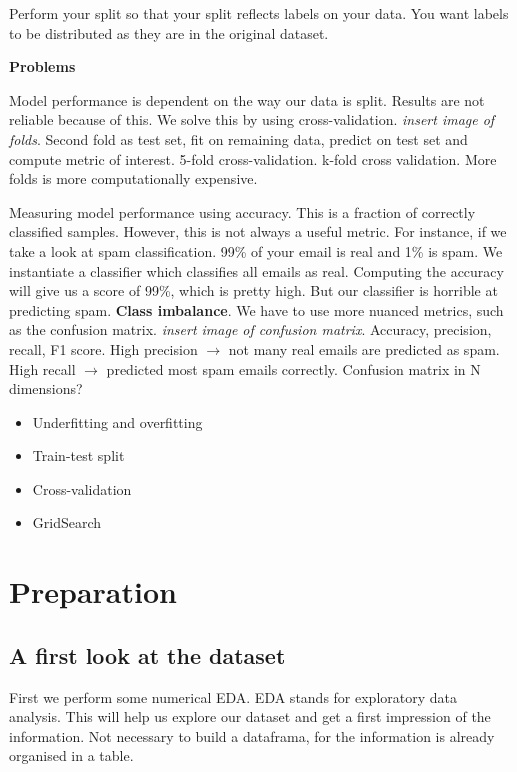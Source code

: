 \documentclass[11pt]{article}
\begin{document}
Perform your split so that your split reflects labels on your data. You want labels to be distributed as they are in the original dataset. 

\textbf{Problems}

Model performance is dependent on the way our data is split. Results are not reliable because of this. We solve this by using cross-validation. \emph{insert image of folds}. Second fold as test set, fit on remaining data, predict on test set and compute metric of interest. 5-fold cross-validation. k-fold cross validation. More folds is more computationally expensive. 

Measuring model performance using accuracy. This is a fraction of correctly classified samples. However, this is not always a useful metric. For instance, if we take a look at spam classification. 99\% of your email is real and 1\% is spam. We instantiate a classifier which classifies all emails as real. Computing the accuracy will give us a score of 99\%, which is pretty high. But our classifier is horrible at predicting spam. \textbf{Class imbalance}. We have to use more nuanced metrics, such as the confusion matrix. \emph{insert image of confusion matrix}. Accuracy, precision, recall, F1 score. High precision \(\rightarrow\) not many real emails are predicted as spam. High recall \(\rightarrow\) predicted most spam emails correctly. Confusion matrix in N dimensions? 

\begin{itemize}
\item Underfitting and overfitting
\item Train-test split
\item Cross-validation
\item GridSearch
\end{itemize}


\section{Preparation}
\label{sec:org2493246}

\subsection{A first look at the dataset}
\label{sec:orgf4efb69}

First we perform some numerical EDA. EDA stands for exploratory data analysis. This will help us explore our dataset and get a first impression of the information. Not necessary to build a dataframa, for the information is already organised in a table. 
\end{document}
